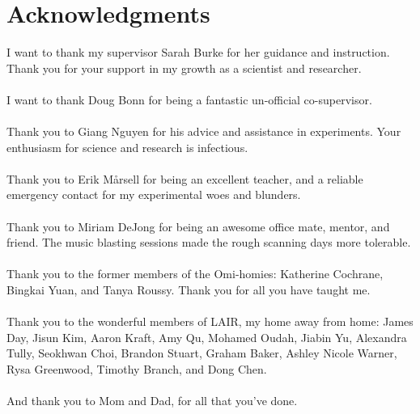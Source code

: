 
\chapter{Acknowledgments}

I want to thank my supervisor Sarah Burke for her guidance and instruction. Thank you for your support in my growth as a scientist and researcher.\\
\\
I want to thank Doug Bonn for being a fantastic un-official co-supervisor.\\
\\
Thank you to Giang Nguyen for his advice and assistance in experiments. Your enthusiasm for science and research is infectious. \\
\\
Thank you to Erik M\aa rsell for being an excellent teacher, and a reliable emergency contact for my experimental woes and blunders.\\
\\
Thank you to Miriam DeJong for being an awesome office mate, mentor, and friend. The music blasting sessions made the rough scanning days more tolerable.\\
\\
Thank you to the former members of the Omi-homies: Katherine Cochrane, Bingkai Yuan, and Tanya Roussy. Thank you for all you have taught me.\\
\\
Thank you to the wonderful members of LAIR, my home away from home: James Day, Jisun Kim, Aaron Kraft, Amy Qu, Mohamed Oudah, Jiabin Yu, Alexandra Tully, Seokhwan Choi, Brandon Stuart, Graham Baker, Ashley Nicole Warner, Rysa Greenwood, Timothy Branch, and Dong Chen.\\
\\
And thank you to Mom and Dad, for all that you've done.








